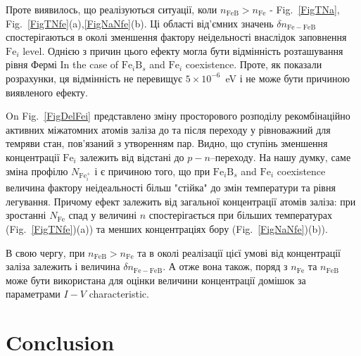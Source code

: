 \documentclass[12pt]{article}
\begin{document}
Проте виявилось, що реалізуються ситуації, коли $n_\mathrm{FeB}>n_\mathrm{Fe}$  - Fig.~\ref{FigTNa}, Fig.~\ref{FigTNfe}(a),\ref{FigNaNfe}(b).
Ці області від'ємних значень $\delta n_\mathrm{Fe-FeB}$ спостерігаються в околі зменшення фактору неідельності
внаслідок заповнення $\mathrm{Fe}_i$ level.
Однією з причин цього ефекту могла бути відмінність розташування рівня Фермі
In the case of $\mathrm{Fe}_i\mathrm{B}_s$ and $\mathrm{Fe}_i$ coexistence.
Проте, як показали розрахунки, ця відмінність не перевищує $5\times10^{-6}$~eV і
не може бути причиною виявленого ефекту.

On Fig.~\ref{FigDelFei} представлено зміну просторового розподілу рекомбінаційно активних міжатомних
атомів заліза до та після переходу у рівноважний для темряви стан, пов'язаний
з утворенням пар.
Видно, що 
ступінь зменшення концентрації $\mathrm{Fe}_i$ залежить від відстані до $p-n$--переходу.
На нашу думку, саме зміна профілю $N_{\mathrm{Fe}_i^+}$ і є причиною того, що при 
$\mathrm{Fe}_i\mathrm{B}_s$ and $\mathrm{Fe}_i$ coexistence 
величина фактору неідеальності більш "стійка" до змін температури та рівня легування.
Причому ефект залежить від загальної концентрації атомів заліза: при зростанні $N_{\mathrm{Fe}}$
спад у величині $n$ спостерігається при більших температурах (Fig.~\ref{FigTNfe})(a)) та менших
концентраціях бору (Fig.~\ref{FigNaNfe})(b)).

В свою чергу, при $n_\mathrm{FeB}>n_\mathrm{Fe}$ та в околі реалізації цієї умові від концентрації
заліза залежить і величина $\delta n_\mathrm{Fe-FeB}$.
А отже вона також, поряд з $n_\mathrm{Fe}$ та $n_\mathrm{FeB}$ може бути використана
для оцінки величини концентрації домішок за параметрами $I-V$ characteristic.

\section{Conclusion}
\end{document}
